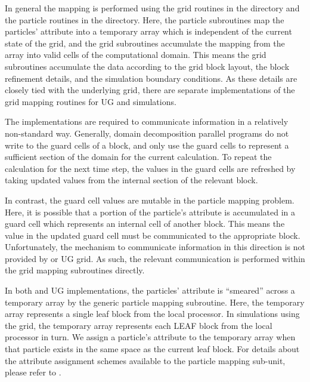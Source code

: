 In general the mapping is performed using the grid routines in the
 directory and the particle routines in
the  directory.  Here, the particle subroutines
map the particles' attribute into a temporary array which is
independent of the current state of the grid, and the grid subroutines
accumulate the mapping from the array into valid cells of the
computational domain.  This means the grid subroutines accumulate the data
according to the grid block layout, the block refinement details, and
the simulation boundary conditions.  As these details are closely tied
with the underlying grid, there are separate implementations of the
grid mapping routines for UG and \Paramesh simulations.

The implementations are required to communicate information in a
relatively non-standard way.  Generally, domain decomposition parallel
programs do not write to the guard cells of a block, and only use the
guard cells to represent a sufficient section of the domain for the
current calculation.  To repeat the calculation for the next time
step, the values in the guard cells are refreshed by taking updated
values from the internal section of the relevant block.

In contrast, the guard cell values are mutable in the particle mapping
problem.  Here, it is possible that a portion of the particle's
attribute is accumulated in a guard cell which represents an internal
cell of another block.  This means the value in the updated guard cell
must be communicated to the appropriate block.  Unfortunately, the
mechanism to communicate information in this direction is not provided
by \Paramesh or UG grid.  As such, the relevant communication is
performed within the grid mapping subroutines directly.

In both \Paramesh and UG implementations, the particles' attribute is
``smeared'' across a temporary array by the generic particle mapping
subroutine.  Here, the temporary array represents a single leaf block
from the local processor.  In simulations using the \Paramesh grid,
the temporary array represents each LEAF block from the local
processor in turn.  We assign a particle's attribute to the temporary array when that
particle exists in the same space as the current leaf block.  For
details about the attribute assignment schemes available to the
particle mapping sub-unit, please refer to .  


